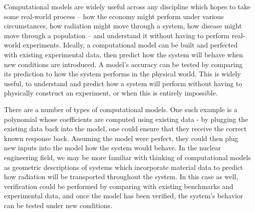 
Computational models are widely useful across any discipline which hopes to take some real-world process -- how the economy might perform under various circumstances, how radiation might move through a system, how disease might move through a population -- and understand it without having to perform real-world experiments. Ideally, a computational model can be built and perfected with existing experimental data, then predict how the system will behave when new conditions are introduced. A model's accuracy can be tested by comparing its prediction to how the system performs in the physical world. This is widely useful, to understand and predict how a system will perform without having to physically construct an experiment, or when this is entirely impossible.

There are a number of types of computational models. One such example is a polynomial whose coefficients are computed using existing data - by plugging the existing data back into the model, one could ensure that they receive the correct known response back. Assuming the model were perfect, they could then plug new inputs into the model how the system would behave. In the nuclear engineering field, we may be more familiar with thinking of computational models as geometric descriptions of systems which incorporate material data to predict how radiation will be transported throughout the system. In this case as well, verification could be performed by comparing with existing benchmarks and experimental data, and once the model has been verified, the system's behavior can be tested under new conditions.

